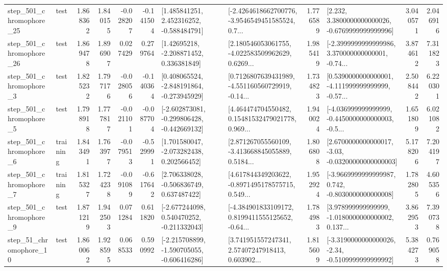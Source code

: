 \begin{tabular}{llrrrrllrlrr}
  step\_501\_chromophore\_25 &      test &      1.868362 &    1.840155 &     -0.028207 & -0.141504 &    [1.485841251, 2.452316252, -0.588484791] &  [-2.4264618662700776, -3.9546549451585524, 0.7... &       1.776589 &   [2.232, 3.3800000000000026, -0.6769999999999996] &            3.040571 &          2.046916 \\
  step\_501\_chromophore\_26 &      test &      1.869478 &    1.896907 &      0.027429 &  0.279764 &     [1.42695218, -2.208871452, 0.336381849] &  [2.180546053061755, -4.022583509962629, 0.6269... &       1.985419 &  [-2.3999999999999986, 3.370000000000001, -0.74... &            3.874612 &          7.311823 \\
   step\_501\_chromophore\_3 &      test &      1.825232 &    1.797176 &     -0.028056 & -0.140364 &   [0.408065524, -2.848191864, -0.273945929] &  [0.7126807639431989, -4.551160560729919, -0.14... &       1.734823 &  [0.5390000000000001, -4.111999999999999, -0.57... &            2.508442 &          6.220301 \\
   step\_501\_chromophore\_5 &      test &      1.798918 &    1.777817 &     -0.021101 & -0.087704 &  [-2.602873081, -0.299806428, -0.442669132] &  [4.464474704550482, 0.15481532479021778, 0.969... &       1.940024 &  [-4.036999999999999, -0.4450000000000003, -0.5... &            1.651809 &          6.021082 \\
   step\_501\_chromophore\_6 &  training &      1.843491 &    1.763977 &     -0.079513 & -0.529991 &    [1.701580047, -2.073282438, 0.202566452] &  [2.871267055560109, -3.413668845055889, 0.5184... &       1.806808 &  [2.6700000000000017, -3.03, -0.03200000000000003] &            5.178206 &          7.204197 \\
   step\_501\_chromophore\_7 &  training &      1.815327 &    1.724238 &     -0.091089 & -0.617642 &    [2.706338028, -0.506836749, 0.637487422] &  [4.617844349203622, -0.8971495178575715, 0.549... &       1.952924 &  [-3.9669999999999987, 0.742, -0.8030000000000008] &            1.782805 &          4.605356 \\
   step\_501\_chromophore\_9 &      test &      1.871219 &    1.942503 &      0.071284 &  0.611820 &   [-2.677244098, 0.540470252, -0.211332043] &  [-4.384901833109172, 0.8199411555125652, -0.64... &       1.784983 &  [3.978999999999999, -1.0180000000000002, 0.137... &            3.862953 &          7.390738 \\
   step\_51\_chromophore\_10 &      test &      1.860062 &    1.928595 &      0.068533 &  0.590992 &  [-2.215708899, -1.590705055, -0.606416286] &  [3.741951557247341, 2.57407247918413, 0.603902... &       1.815609 &  [-3.3190000000000026, -2.34, -0.5109999999999992] &            5.384273 &          0.769058 \\

\end{tabular}
